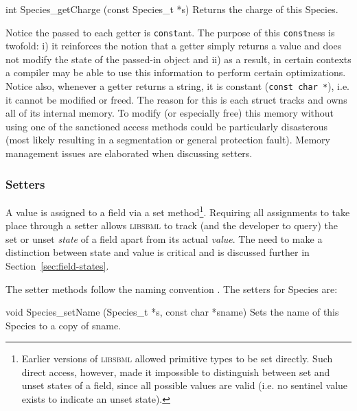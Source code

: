 \documentclass{cekmanual}
\begin{document}
\begin{methoddef}{int Species\_getCharge (const Species\_t *s)}
  Returns the charge of this Species.
\end{methoddef}

Notice the  passed to each getter is
\texttt{const}ant.  The purpose of this \texttt{const}ness is twofold:
i) it reinforces the notion that a getter simply returns a value and
does not modify the state of the passed-in object and ii) as a result,
in certain contexts a compiler may be able to use this information to
perform certain optimizations.  Notice also, whenever a getter returns
a string, it is constant (\texttt{const char *}), i.e. it cannot be
modified or freed.  The reason for this is each struct tracks and owns
all of its internal memory.  To modify (or especially free) this
memory without using one of the sanctioned access methods could be
particularly disasterous (most likely resulting in a segmentation or
general protection fault).  Memory management issues are elaborated
when discussing setters.


\subsubsection{Setters}

A value is assigned to a field via a set method\footnote{Earlier
versions of \textsc{libsbml} allowed primitive types to be set
directly.  Such direct access, however, made it impossible to
distinguish between set and unset states of a field, since all
possible values are valid (i.e. no sentinel value exists to indicate
an unset state).}.  Requiring all assignments to take place through a
setter allows \textsc{libsbml} to track (and the developer to query)
the set or unset \emph{state} of a field apart from its actual
\emph{value}.  The need to make a distinction between state and value
is critical and is discussed further in
Section~\ref{sec:field-states}.

The setter methods follow the naming convention
.  The setters for Species are:


\begin{methoddef}{void Species\_setName (Species\_t *s, const char *sname)}
  Sets the name of this Species to a copy of sname.
\end{methoddef}
\end{document}
